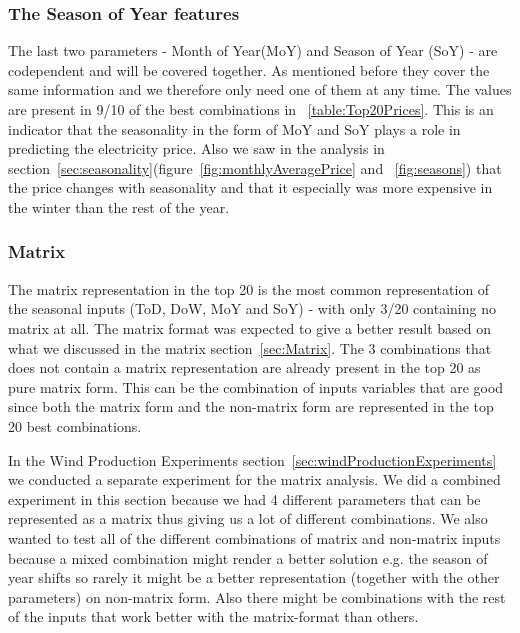\subsubsection{The Season of Year features}
The last two parameters - Month of Year(MoY) and Season of Year (SoY) - are codependent and will be covered together. As mentioned before they cover the same information and we therefore only need one of them at any time. The values are present in 9/10 of the best combinations in ~\ref{table:Top20Prices}. This is an indicator that the seasonality in the form of MoY and SoY plays a role in predicting the electricity price. Also we saw in the analysis in section~\ref{sec:seasonality}(figure~\ref{fig:monthlyAveragePrice} and ~\ref{fig:seasons}) that the price changes with seasonality and that it especially was more expensive in the winter than the rest of the year.

\subsubsection{Matrix}
The matrix representation in the top 20 is the most common representation of the seasonal inputs (ToD, DoW, MoY and SoY) - with only 3/20 containing no matrix at all. The matrix format was expected to give a better result based on what we discussed in the matrix section~\ref{sec:Matrix}. The 3 combinations that does not contain a matrix representation are already present in the top 20 as pure matrix form. This can be the combination of inputs variables that are good since both the matrix form and the non-matrix form are represented in the top 20 best combinations.

In the Wind Production Experiments section~\ref{sec:windProductionExperiments} we conducted a separate experiment for the matrix analysis. We did a combined experiment in this section because we had 4 different parameters that can be represented as a matrix thus giving us a lot of different combinations. We also wanted to test all of the different combinations of matrix and non-matrix inputs because a mixed combination might render a better solution e.g. the season of year shifts so rarely it might be a better representation (together with the other parameters) on non-matrix form. Also there might be combinations with the rest of the inputs that work better with the matrix-format than others.

